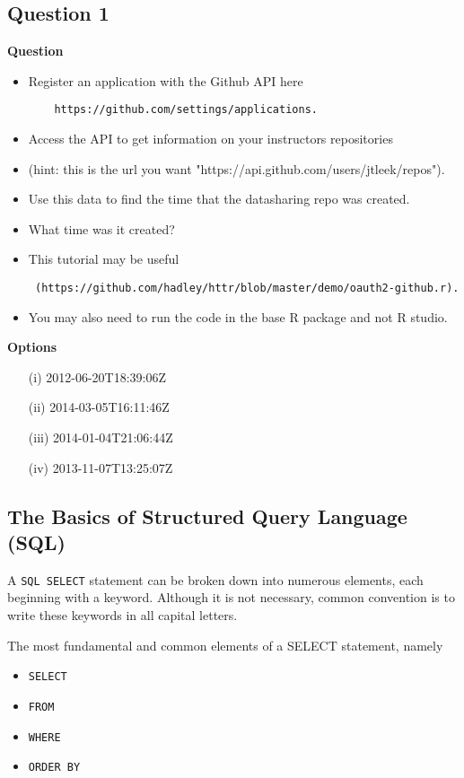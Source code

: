 \documentclass[12pt]{article}
\begin{document}
\subsection*{Question 1}
\textbf{Question}
\begin{itemize}
	\item Register an application with the Github API here 
	\begin{verbatim}
	https://github.com/settings/applications. 
	\end{verbatim}
	\item Access the API to get information on your instructors repositories 
	\item (hint: this is the url you want "https://api.github.com/users/jtleek/repos"). \item Use this data to find the time that the datasharing repo was created. \item What time was it created?
	\item This tutorial may be useful
	\begin{verbatim} (https://github.com/hadley/httr/blob/master/demo/oauth2-github.r).
	\end{verbatim}
	\item You may also need to run the code in the base R package and not R studio.
\end{itemize}

\noindent \textbf{Options} \\
\begin{itemize}
\item[(i)] 2012-06-20T18:39:06Z
\item[(ii)] 2014-03-05T16:11:46Z
\item[(iii)] 2014-01-04T21:06:44Z
\item[(iv)] 2013-11-07T13:25:07Z
\end{itemize}
\newpage
\subsection*{The Basics of Structured Query Language (SQL)}

A \texttt{SQL SELECT} statement can be broken down into numerous elements, each beginning with a keyword. Although it is not necessary, common convention is to write these keywords in all capital letters. 

The most fundamental and common elements of a SELECT statement, namely

\begin{itemize}
\item \texttt{SELECT}
\item \texttt{FROM}
\item \texttt{WHERE}
\item \texttt{ORDER BY}
\end{itemize}
\end{document}
